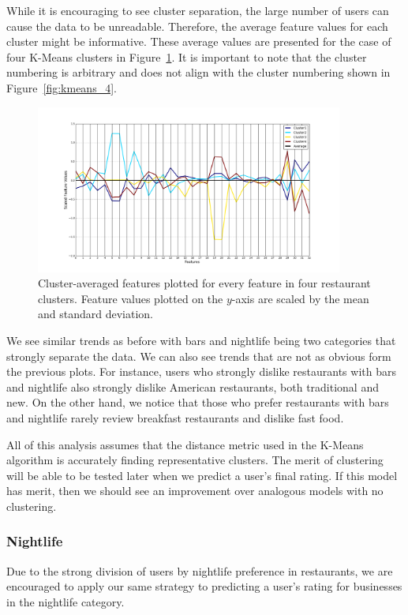 \documentclass[11pt]{article}
\begin{document}
While it is encouraging to see cluster separation, the large number of users can cause the data to be unreadable. Therefore, the average feature values for each cluster might be informative. These average values are presented for the case of four K-Means clusters in Figure~\ref{fig:kmeans_4_avg}. It is important to note that the cluster numbering is arbitrary and does not align with the cluster numbering shown in Figure~\ref{fig:kmeans_4}. 

\begin{figure}[h!]
	\centering
	\includegraphics[width=0.9\textwidth]{kmeans4clusters.png}
	\caption{Cluster-averaged features plotted for every feature in four restaurant clusters. Feature values plotted on the $y$-axis are scaled by the mean and standard deviation.}
	\label{fig:kmeans_4_avg}
\end{figure}

We see similar trends as before with bars and nightlife being two categories that strongly separate the data. We can also see trends that are not as obvious form the previous plots. For instance, users who strongly dislike restaurants with bars and nightlife also strongly dislike American restaurants, both traditional and new. On the other hand, we notice that those who prefer restaurants with bars and nightlife rarely review breakfast restaurants and dislike fast food.

All of this analysis assumes that the distance metric used in the K-Means algorithm is accurately finding representative clusters. The merit of clustering will be able to be tested later when we predict a user's final rating. If this model has merit, then we should see an improvement over analogous models with no clustering.

\subsubsection{Nightlife}
Due to the strong division of users by nightlife preference in restaurants, we are encouraged to apply our same strategy to predicting a user's rating for businesses in the nightlife category. 
\end{document}
